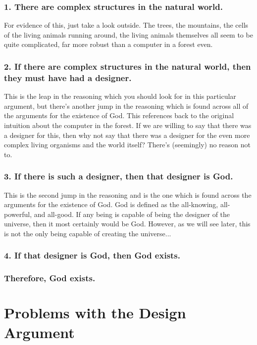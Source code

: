 \subsubsection{1. There are complex structures in the natural world.}

For evidence of this, just take a look outside. The trees, the mountains, the cells of the living animals running around, the living animals themselves all seem to be quite complicated, far more robust than a computer in a forest even.

    \subsubsection{2. If there are complex structures in the natural world, then they must have had a designer.}

This is the leap in the reasoning which you should look for in this particular argument, but there's another jump in the reasoning which is found across all of the arguments for the existence of God. This references back to the original intuition about the computer in the forest. If we are willing to say that there was a designer for this, then why not say that there was a designer for the even more complex living organisms and the world itself? There's (seemingly) no reason not to. 

    \subsubsection{3. If there is such a designer, then that designer is God.}

This is the second jump in the reasoning and is the one which is found across the arguments for the existence of God. God is defined as the all-knowing, all-powerful, and all-good. If any being is capable of being the designer of the universe, then it most certainly would be God. However, as we will see later, this is not the only being capable of creating the universe... 

    \subsubsection{4. If that designer is God, then God exists.}
    \subsubsection{Therefore, God exists.} 

\section{Problems with the Design Argument}
